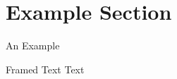 \section{Example Section}
\begin{frame}{An Example}
\begin{block}{Framed Text}
Text
\end{block}
\end{frame}